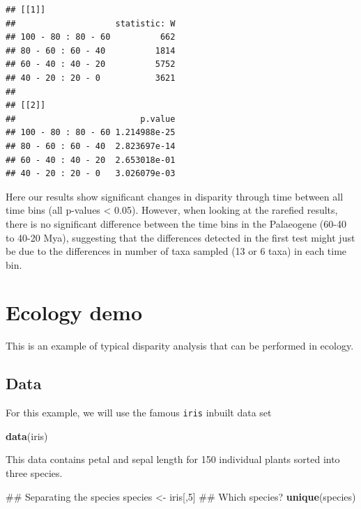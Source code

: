 \documentclass[]{book}
\newenvironment{Shaded}{\begin{snugshade}}{\end{snugshade}}
\newcommand{\KeywordTok}[1]{\textcolor[rgb]{0.13,0.29,0.53}{\textbf{#1}}}
\newcommand{\DecValTok}[1]{\textcolor[rgb]{0.00,0.00,0.81}{#1}}
\newcommand{\StringTok}[1]{\textcolor[rgb]{0.31,0.60,0.02}{#1}}
\newcommand{\NormalTok}[1]{#1}
\theoremstyle{definition}
\theoremstyle{definition}
\theoremstyle{remark}
\begin{document}
\begin{verbatim}
## [[1]]
##                    statistic: W
## 100 - 80 : 80 - 60          662
## 80 - 60 : 60 - 40          1814
## 60 - 40 : 40 - 20          5752
## 40 - 20 : 20 - 0           3621
## 
## [[2]]
##                         p.value
## 100 - 80 : 80 - 60 1.214988e-25
## 80 - 60 : 60 - 40  2.823697e-14
## 60 - 40 : 40 - 20  2.653018e-01
## 40 - 20 : 20 - 0   3.026079e-03
\end{verbatim}

Here our results show significant changes in disparity through time
between all time bins (all p-values \textless{} 0.05). However, when
looking at the rarefied results, there is no significant difference
between the time bins in the Palaeogene (60-40 to 40-20 Mya), suggesting
that the differences detected in the first test might just be due to the
differences in number of taxa sampled (13 or 6 taxa) in each time bin.

\chapter{Ecology demo}\label{ecology-demo}

This is an example of typical disparity analysis that can be performed
in ecology.

\section{Data}\label{data}

For this example, we will use the famous \texttt{iris} inbuilt data set

\begin{Shaded}
\begin{Highlighting}[]
\KeywordTok{data}\NormalTok{(iris)}
\end{Highlighting}
\end{Shaded}

This data contains petal and sepal length for 150 individual plants
sorted into three species.

\begin{Shaded}
\begin{Highlighting}[]
\NormalTok{## Separating the species}
\NormalTok{species <-}\StringTok{ }\NormalTok{iris[,}\DecValTok{5}\NormalTok{]}
\NormalTok{## Which species?}
\KeywordTok{unique}\NormalTok{(species)}
\end{Highlighting}
\end{Shaded}
\end{document}
